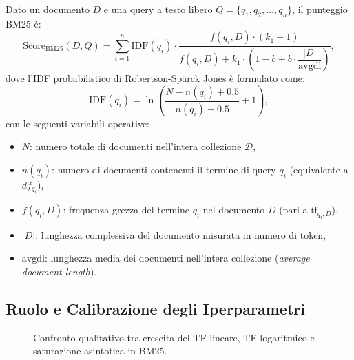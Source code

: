 Dato un documento $D$ e una query a testo libero $Q = \{q_1, q_2, \dots, q_n\}$, il punteggio BM25 \`e:
\begin{equation}
\text{Score}_{\text{BM25}}(D, Q) = \sum_{i=1}^{n} \text{IDF}(q_i) \cdot \frac{f(q_i, D) \cdot (k_1 + 1)}{f(q_i, D) + k_1 \cdot \left(1 - b + b \cdot \dfrac{|D|}{\text{avgdl}}\right)},
\label{eq:bm25-full}
\end{equation}
dove l'IDF probabilistico di Robertson-Sp\"arck Jones \`e formulato come:
\begin{equation}
\text{IDF}(q_i) = \ln\left( \frac{N - n(q_i) + 0.5}{n(q_i) + 0.5} + 1 \right),
\end{equation}
con le seguenti variabili operative:
\begin{itemize}
    \item $N$: numero totale di documenti nell'intera collezione $\mathcal{D}$,
    \item $n(q_i)$: numero di documenti contenenti il termine di query $q_i$ (equivalente a $df_{q_i}$),
    \item $f(q_i, D)$: frequenza grezza del termine $q_i$ nel documento $D$ (pari a $\text{tf}_{q_i, D}$),
    \item $|D|$: lunghezza complessiva del documento misurata in numero di token,
    \item $\text{avgdl}$: lunghezza media dei documenti nell'intera collezione (\textit{average document length}).
\end{itemize}

\subsection{Ruolo e Calibrazione degli Iperparametri}

\begin{figure}[H]
\centering
{}
\caption{Confronto qualitativo tra crescita del TF lineare, TF logaritmico e saturazione asintotica in BM25.}
\label{fig:bm25-saturation-curve}
\end{figure}

